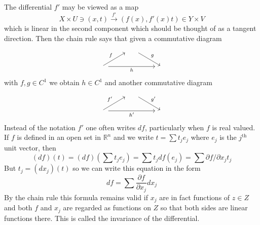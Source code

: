 The differential $f'$ may be viewed as a map
\[
	X \times U \ni(x, t) \xrightarrow{f'}\left(f(x), f'(x) t\right) \in Y \times V
\]
which is linear in the second component which should be thought of as a tangent direction. Then the chain rule says that given a commutative diagram
\[
    \begin{tikzcd}
    {}&\quad\arrow[rd,"g"]&{}\\
    \quad\arrow[ur,"f"]\arrow[rr,"h"']&{}&\quad
    \end{tikzcd}
\]
with $f, g \in C^{1}$ we obtain $h \in C^{1}$ and another commutative diagram
\[
    \begin{tikzcd}
    {}&\quad\arrow[rd,"g'"]&{}\\
    \quad\arrow[ur,"f'"]\arrow[rr,"h'"']&{}&\quad
    \end{tikzcd}
\]
Instead of the notation $f'$ one often writes $d f$, particularly when $f$ is real valued. If $f$ is defined in an open set in $\mathbb{R}^{n}$ and we write $t=\sum t_{j} e_{j}$ where $e_{j}$ is the $j^{\text {th }}$ unit vector, then
\[
	(d f)(t)=(d f)\left(\sum t_{j} e_{j}\right)=\sum t_{j} d f\left(e_{j}\right)=\sum \partial f / \partial x_{j} t_{j}
\]
But $t_{j}=\left(d x_{j}\right)(t)$ so we can write this equation in the form
\[
	d f=\sum \frac{\partial f }{\partial x_{j}} d x_{j}
\]
By the chain rule this formula remains valid if $x_{j}$ are in fact functions of $z \in Z$ and both $f$ and $x_{j}$ are regarded as functions on $Z$ so that both sides are linear functions there. This is called the invariance of the differential.


